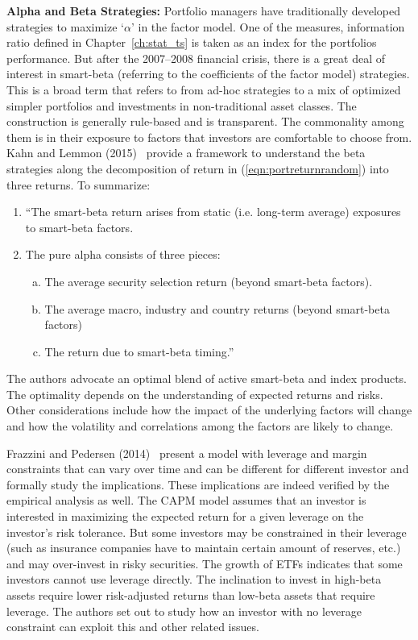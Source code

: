 \noindent\textbf{Alpha and Beta Strategies:} Portfolio managers have traditionally developed strategies to maximize `$\alpha$' in the factor model. One of the measures, information ratio defined in Chapter~\ref{ch:stat_ts} is taken as an index for the portfolios performance. But after the 2007--2008 financial crisis, there is a great deal of interest in smart-beta (referring to the coefficients of the factor model) strategies. This is a broad term that refers to from ad-hoc strategies to a mix of optimized simpler portfolios and investments in non-traditional asset classes. The construction is generally rule-based and is transparent. The commonality among them is in their exposure to factors that investors are comfortable to choose from. Kahn and Lemmon (2015)~\cite{lemmon} provide a framework to understand the beta strategies along the decomposition of return in (\ref{eqn:portreturnrandom}) into three returns. To summarize:
	\begin{enumerate}[--]
	\item ``The smart-beta return arises from static (i.e. long-term average) exposures to smart-beta factors.
	\item The pure alpha consists of three pieces:
		\begin{enumerate}[a.]
		\item The average security selection return (beyond smart-beta factors).
		\item The average macro, industry and country returns (beyond smart-beta factors)
		\item The return due to smart-beta timing.''
		\end{enumerate}
	\end{enumerate}
The authors advocate an optimal blend of active smart-beta and index products. The optimality depends on the understanding of expected returns and risks. Other considerations include how the impact of the underlying factors will change and how the volatility and correlations among the factors are likely to change. 


Frazzini and Pedersen (2014)~\cite{frazped} present a model with leverage and margin constraints that can vary over time and can be different for different investor and formally study the implications. These implications are indeed verified by the empirical analysis as well. The CAPM model assumes that an investor is interested in maximizing the expected return for a given leverage on the investor's risk tolerance. But some investors may be constrained in their leverage (such as insurance companies have to maintain certain amount of reserves, etc.) and may over-invest in risky securities. The growth of ETFs indicates that some investors cannot use leverage directly. The inclination to invest in high-beta assets require lower risk-adjusted returns than low-beta assets that require leverage. The authors set out to study how an investor with no leverage constraint can exploit this and other related issues. 


